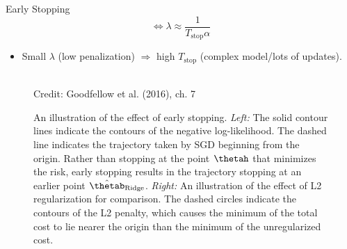 \begin{vbframe}{Early Stopping}
\begin{equation*}
        \Leftrightarrow \lambda \approx \frac{1}{T_{\text{stop}} \alpha}
    \end{equation*}
  \begin{itemize}
    \item Small $\lambda$ (low penalization) $\Rightarrow$ high $T_{\text{stop}}$ (complex model/lots of updates).
  \end{itemize}
\framebreak
  \begin{figure}
    \centering
      \tiny{\\ Credit: Goodfellow et al. (2016), ch. 7}
      \caption{\footnotesize An illustration of the effect of early stopping. \textit{Left:} The solid contour lines indicate the contours of the negative log-likelihood. The dashed line indicates the trajectory taken by SGD beginning from the origin. Rather than stopping at the point $\thetah$ that minimizes the risk, early stopping results in the trajectory stopping at an earlier point $\hat{\thetab}_{\text{Ridge}}$. \textit{Right:} An illustration of the effect of L2 regularization for comparison. The dashed circles indicate the contours of the L2 penalty, which causes the minimum of the total cost to lie nearer the origin than the minimum of the unregularized cost.}
  \end{figure}
\end{vbframe}

\endlecture
